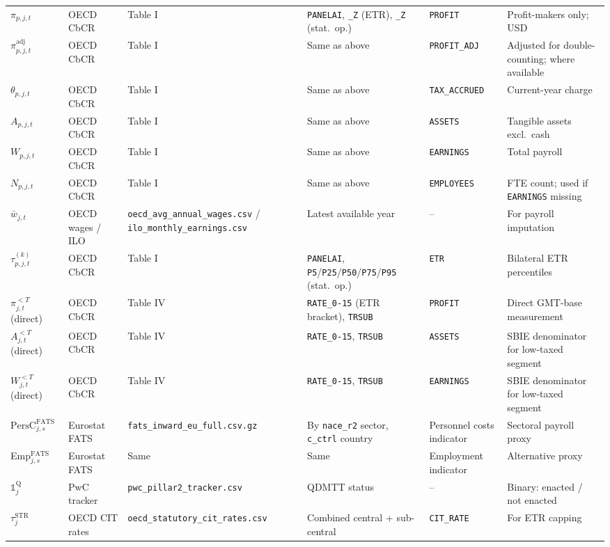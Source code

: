 \documentclass[11pt,a4paper]{article}
\newcommand{\code}[1]{\texttt{#1}}
\begin{document}
\begin{landscape}
\begin{longtable}{@{}p{2.5cm}p{3cm}p{2cm}p{2.5cm}p{3cm}p{3cm}@{}}
$\pi_{p,j,t}$ & OECD CbCR & Table I & \code{PANELAI}, \code{\_Z} (ETR), \code{\_Z} (stat.\ op.) & \code{PROFIT} & Profit-makers only; USD \\
$\pi_{p,j,t}^{\text{adj}}$ & OECD CbCR & Table I & Same as above & \code{PROFIT\_ADJ} & Adjusted for double-counting; where available \\
$\theta_{p,j,t}$ & OECD CbCR & Table I & Same as above & \code{TAX\_ACCRUED} & Current-year charge \\
$A_{p,j,t}$ & OECD CbCR & Table I & Same as above & \code{ASSETS} & Tangible assets excl.\ cash \\
$W_{p,j,t}$ & OECD CbCR & Table I & Same as above & \code{EARNINGS} & Total payroll \\
$N_{p,j,t}$ & OECD CbCR & Table I & Same as above & \code{EMPLOYEES} & FTE count; used if \code{EARNINGS} missing \\
$\bar{w}_{j,t}$ & OECD wages / ILO & \code{oecd\_avg\_annual\_wages.csv} / \code{ilo\_monthly\_earnings.csv} & Latest available year & -- & For payroll imputation \\
$\tau_{p,j,t}^{(k)}$ & OECD CbCR & Table I & \code{PANELAI}, \code{P5}/\code{P25}/\code{P50}/\code{P75}/\code{P95} (stat.\ op.) & \code{ETR} & Bilateral ETR percentiles \\
$\pi_{j,t}^{<T}$ (direct) & OECD CbCR & Table IV & \code{RATE\_0-15} (ETR bracket), \code{TRSUB} & \code{PROFIT} & Direct GMT-base measurement \\
$A_{j,t}^{<T}$ (direct) & OECD CbCR & Table IV & \code{RATE\_0-15}, \code{TRSUB} & \code{ASSETS} & SBIE denominator for low-taxed segment \\
$W_{j,t}^{<T}$ (direct) & OECD CbCR & Table IV & \code{RATE\_0-15}, \code{TRSUB} & \code{EARNINGS} & SBIE denominator for low-taxed segment \\
$\text{PersC}_{j,s}^{\text{FATS}}$ & Eurostat FATS & \code{fats\_inward\_eu\_full.csv.gz} & By \code{nace\_r2} sector, \code{c\_ctrl} country & Personnel costs indicator & Sectoral payroll proxy \\
Emp$_{j,s}^{\text{FATS}}$ & Eurostat FATS & Same & Same & Employment indicator & Alternative proxy \\
$\mathbb{1}_j^{\text{Q}}$ & PwC tracker & \code{pwc\_pillar2\_tracker.csv} & QDMTT status & -- & Binary: enacted / not enacted \\
$\tau_{j}^{\text{STR}}$ & OECD CIT rates & \code{oecd\_statutory\_cit\_rates.csv} & Combined central + sub-central & \code{CIT\_RATE} & For ETR capping \\

\end{longtable}
\end{landscape}
\end{document}
